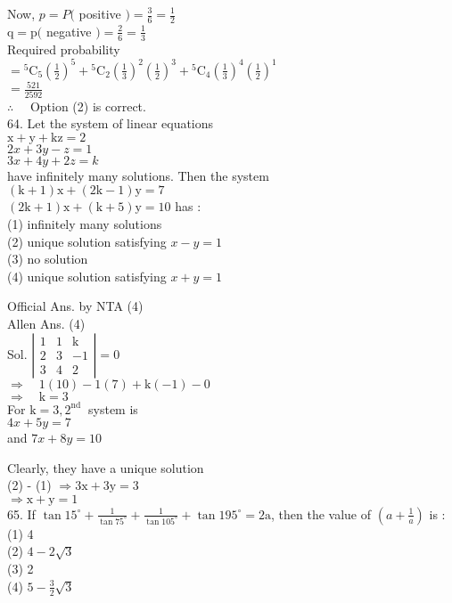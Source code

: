 \documentclass[10pt]{article}
\begin{document}
Now, \(p=P(\) positive \()=\frac{3}{6}=\frac{1}{2}\)\\
\(\mathrm{q}=\mathrm{p}(\) negative \()=\frac{2}{6}=\frac{1}{3}\)\\
Required probability\\
\(={ }^{5} \mathrm{C}_{5}\left(\frac{1}{2}\right)^{5}+{ }^{5} \mathrm{C}_{2}\left(\frac{1}{3}\right)^{2}\left(\frac{1}{2}\right)^{3}+{ }^{5} \mathrm{C}_{4}\left(\frac{1}{3}\right)^{4}\left(\frac{1}{2}\right)^{1}\)\\
\(=\frac{521}{2592}\)\\
\(\therefore \quad\) Option (2) is correct.\\
64. Let the system of linear equations\\
\(\mathrm{x}+\mathrm{y}+\mathrm{kz}=2\)\\
\(2 x+3 y-z=1\)\\
\(3 x+4 y+2 z=k\)\\
have infinitely many solutions. Then the system\\
\((\mathrm{k}+1) \mathrm{x}+(2 \mathrm{k}-1) \mathrm{y}=7\)\\
\((2 \mathrm{k}+1) \mathrm{x}+(\mathrm{k}+5) \mathrm{y}=10\) has :\\
(1) infinitely many solutions\\
(2) unique solution satisfying \(x-y=1\)\\
(3) no solution\\
(4) unique solution satisfying \(x+y=1\)

Official Ans. by NTA (4)\\
Allen Ans. (4)\\
Sol. \(\left|\begin{array}{ccc}1 & 1 & \mathrm{k} \\ 2 & 3 & -1 \\ 3 & 4 & 2\end{array}\right|=0\)\\
\(\Rightarrow \quad 1(10)-1(7)+\mathrm{k}(-1)-0\)\\
\(\Rightarrow \quad \mathrm{k}=3\)\\
For \(\mathrm{k}=3,2^{\text {nd }}\) system is\\
\(4 x+5 y=7\)\\
and \(7 x+8 y=10\)

Clearly, they have a unique solution\\
(2) - (1) \(\Rightarrow 3 \mathrm{x}+3 \mathrm{y}=3\)\\
\(\Rightarrow \mathrm{x}+\mathrm{y}=1\)\\
65. If \(\tan 15^{\circ}+\frac{1}{\tan 75^{\circ}}+\frac{1}{\tan 105^{\circ}}+\tan 195^{\circ}=2 \mathrm{a}\), then the value of \(\left(a+\frac{1}{a}\right)\) is :\\
(1) 4\\
(2) \(4-2 \sqrt{3}\)\\
(3) 2\\
(4) \(5-\frac{3}{2} \sqrt{3}\)
\end{document}
